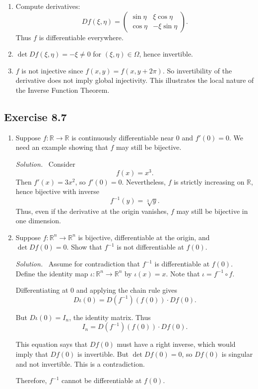 \documentclass[11pt,a4paper]{article}
\newenvironment{solution}{\par\noindent\textit{Solution.}\ }{\par\vspace{0.5em}}
\begin{document}
\begin{enumerate}[label=\alph*)]
	\item Compute derivatives:
	\[
	Df(\xi,\eta)=
	\begin{pmatrix}
		\sin \eta & \xi\cos \eta\\
		\cos \eta & -\xi \sin \eta
	\end{pmatrix}.
	\]
	Thus $f$ is differentiable everywhere.
	
	\item $\det Df(\xi,\eta)=-\xi\neq 0$ for $(\xi,\eta)\in \Omega$, hence invertible.
	
	\item $f$ is not injective since $f(x,y)=f(x,y+2\pi)$.  
	So invertibility of the derivative does not imply global injectivity.  
	This illustrates the local nature of the Inverse Function Theorem.
\end{enumerate}


\subsection*{Exercise 8.7}

\begin{enumerate}[label=\alph*)]
	
	\item Suppose $f:\mathbb{R}\to\mathbb{R}$ is continuously differentiable near $0$ and $f'(0)=0$. 
	We need an example showing that $f$ may still be bijective.
	
	\begin{solution}
		Consider
		\[
		f(x)=x^3.
		\]
		Then $f'(x)=3x^2$, so $f'(0)=0$. 
		Nevertheless, $f$ is strictly increasing on $\mathbb{R}$, hence bijective with inverse
		\[
		f^{-1}(y)=\sqrt[3]{y}.
		\]
		Thus, even if the derivative at the origin vanishes, $f$ may still be bijective in one dimension.
	\end{solution}
	
	\item Suppose $f:\mathbb{R}^n\to\mathbb{R}^n$ is bijective, differentiable at the origin, and $\det Df(0)=0$. 
	Show that $f^{-1}$ is not differentiable at $f(0)$.
	
	\begin{solution}
		Assume for contradiction that $f^{-1}$ is differentiable at $f(0)$.  
		Define the identity map $\iota:\mathbb{R}^n\to\mathbb{R}^n$ by $\iota(x)=x$. 
		Note that $\iota=f^{-1}\circ f$.  
		
		Differentiating at $0$ and applying the chain rule gives
		\[
		D\iota(0)= D(f^{-1})(f(0))\cdot Df(0).
		\]
		
		But $D\iota(0)=I_n$, the identity matrix. 
		Thus
		\[
		I_n = D(f^{-1})(f(0)) \cdot Df(0).
		\]
		
		This equation says that $Df(0)$ must have a right inverse, which would imply that $Df(0)$ is invertible. 
		But $\det Df(0)=0$, so $Df(0)$ is singular and not invertible. 
		This is a contradiction.  
		
		Therefore, $f^{-1}$ cannot be differentiable at $f(0)$.
	\end{solution}
	
\end{enumerate}
\end{document}
